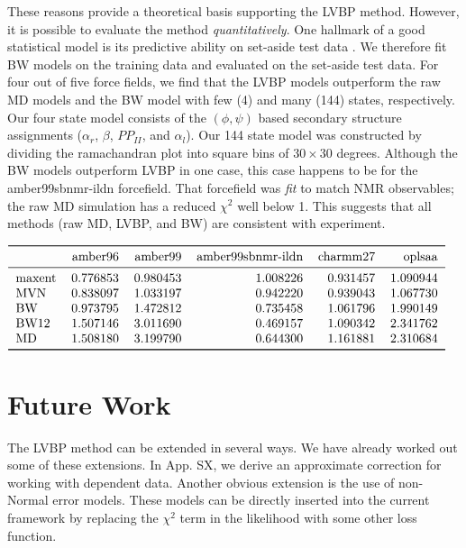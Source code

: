 \documentclass[journal=jacsat,manuscript=article]{achemso}
\begin{document}
These reasons provide a theoretical basis supporting the LVBP method.  However, it is possible to evaluate the method \emph{quantitatively}.  One hallmark of a good statistical model is its predictive ability on set-aside test data \cite{friedman2001elements}.  We therefore fit BW models on the training data and evaluated on the set-aside test data.  For four out of five force fields, we find that the LVBP models outperform the raw MD models and the BW model with few (4) and many (144) states, respectively.  Our four state model consists of the $(\phi, \psi)$ based secondary structure assignments \cite{Jha2005} ($\alpha_r$, $\beta$, $PP_{II}$, and $\alpha_l$).  Our 144 state model was constructed by dividing the ramachandran plot into square bins of $30\times30$ degrees.  Although the BW models outperform LVBP in one case, this case happens to be for the amber99sbnmr-ildn forcefield.  That forcefield was \emph{fit} to match NMR observables; the raw MD simulation has a reduced $\chi^2$ well below 1.  This 
suggests that all methods (raw MD, LVBP, and BW) are consistent with experiment.  

\begin{math}
\begin{tabular}{lrrrrr}
\toprule
{} &   amber96 &   amber99 &  amber99sbnmr-ildn &  charmm27 &    oplsaa \\
\midrule
maxent &  0.776853 &  0.980453 &           1.008226 &  0.931457 &  1.090944 \\
MVN    &  0.838097 &  1.033197 &           0.942220 &  0.939043 &  1.067730 \\
BW     &  0.973795 &  1.472812 &           0.735458 &  1.061796 &  1.990149 \\
BW12   &  1.507146 &  3.011690 &           0.469157 &  1.090342 &  2.341762 \\
MD     &  1.508180 &  3.199790 &           0.644300 &  1.161881 &  2.310684 \\
\bottomrule
\end{tabular}
\end{math}

\section{Future Work}

The LVBP method can be extended in several ways.  We have already worked out some of these extensions.  In App. SX, we derive an approximate correction for working with dependent data.  Another obvious extension is the use of non-Normal error models.  These models can be directly inserted into the current framework by replacing the $\chi^2$ term in the likelihood with some other loss function.  
\end{document}
